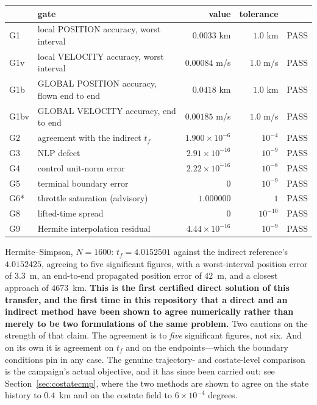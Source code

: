 \documentclass[11pt]{article}
\begin{document}
\begin{table}[h]
\centering\small
\begin{tabular}{llrrl}
\toprule
& gate & value & tolerance & \\
\midrule
G1   & local POSITION accuracy, worst interval & $0.0033$ km & $1.0$ km & PASS \\
G1v  & local VELOCITY accuracy, worst interval & $0.00084$ m/s & $1.0$ m/s & PASS \\
G1b  & GLOBAL POSITION accuracy, flown end to end & $0.0418$ km & $1.0$ km & PASS \\
G1bv & GLOBAL VELOCITY accuracy, end to end & $0.00185$ m/s & $1.0$ m/s & PASS \\
G2   & agreement with the indirect $t_f$ & $1.900\times10^{-6}$ & $10^{-4}$ & PASS \\
G3   & NLP defect & $2.91\times10^{-16}$ & $10^{-9}$ & PASS \\
G4   & control unit-norm error & $2.22\times10^{-16}$ & $10^{-8}$ & PASS \\
G5   & terminal boundary error & $0$ & $10^{-9}$ & PASS \\
G6*  & throttle saturation (advisory) & $1.000000$ & $1$ & PASS \\
G8   & lifted-time spread & $0$ & $10^{-10}$ & PASS \\
G9   & Hermite interpolation residual & $4.44\times10^{-16}$ & $10^{-9}$ & PASS \\
\bottomrule
\end{tabular}
\end{table}

\noindent Hermite--Simpson, $N = 1600$: $t_f = 4.0152501$ against the indirect
reference's $4.0152425$, agreeing to five significant figures, with a
worst-interval position error of $3.3$~m, an end-to-end propagated position error
of $42$~m, and a closest approach of $4673$~km.
\textbf{This is the first certified direct solution of this transfer, and the
first time in this repository that a direct and an indirect method have been
shown to agree numerically rather than merely to be two formulations of the same
problem.} Two cautions on the strength of that claim. The agreement is to
\emph{five} significant figures, not six. And on its own it is agreement on
$t_f$ and on the endpoints---which the boundary conditions pin in any case. The
genuine trajectory- and costate-level comparison is the campaign's actual
objective, and it has since been carried out: see
Section~\ref{sec:costatecmp}, where the two methods are shown to agree on the
state history to $0.4$~km and on the costate field to $6\times10^{-4}$ degrees.
\end{document}
